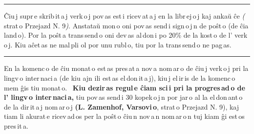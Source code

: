 \thispagestyle{plain}

{\centering\rule{3cm}{0.4pt}\par}

Ĉiu\,j supr\,e skrib\,it\,a\,j verk\,o\,j pov\,as est\,i ricev\,at\,a\,j en la libr\,ej\,o\,j kaj ankaŭ ĉe \textit{} \textit{(}\textit{} strat\,o Przejazd N. 9\textit{)}. Anstataŭ mon\,o oni pov\,as send\,i sign\,o\,j\,n de poŝt\,o (de ĉia land\,o). Por la poŝt\,a trans\,send\,o oni dev\,as al\,don\,i po 20\% de la kost\,o de l’ verk\,o\,j. Kiu aĉet\,as ne mal\,pli ol por unu rubl\,o, tiu por la trans\,send\,o ne pag\,as.

{\centering\rule{3cm}{0.4pt}\par}

En la komenc\,o de ĉiu monat\,o est\,as pres\,at\,a nov\,a nom\,ar\,o de ĉiu\,j verk\,o\,j pri la lingv\,o inter\,naci\,a (de kiu ajn ili est\,as el\,don\,it\,a\,j), kiu\,j el\,ir\,is de la komenc\,o mem ĝis tiu monat\,o. \leftpointright{}~{\didone\bf Kiu dezir\,as regul\,e ĉiam sci\,i pri la progres\,ad\,o de l’ lingv\,o inter\,naci\,a,}\rightpointleft{} tiu pov\,as send\,i 30 kopek\,o\,j\,n por jar\,o al la el\,don\,ant\,o de la dir\,it\,a\,j nom\,ar\,o\,j {\didone\bf (L. Zamenhof, Varsovi\,o}, strat\,o Przejazd N. 9), kaj tiam li akurat\,e ricev\,ad\,os per la poŝt\,o ĉiu\,n nov\,a\,n nom\,ar\,o\,n tuj kiam ĝi est\,os pres\,it\,a.

{\centering{}\par}

\normalsize
\newpage